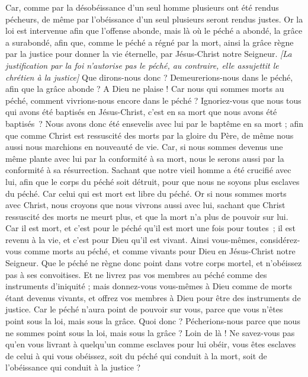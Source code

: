 \begin{multicols}{2}
Car, comme par la désobéissance d'un seul homme plusieurs ont été rendus pécheurs, de même par l'obéissance d'un seul plusieurs seront rendus justes.
Or la loi est intervenue afin que l'offense abonde, mais là où le péché a abondé, la grâce a surabondé,
afin que, comme le péché a régné par la mort, ainsi la grâce règne par la justice pour donner la vie éternelle, par Jésus-Christ notre Seigneur.
\textit{[La justification par la foi n'autorise pas le péché, au contraire, elle assujettit le chrétien à la justice]}
\VerseOne{}Que dirons-nous donc ? Demeurerions-nous dans le péché, afin que la grâce abonde ?
A Dieu ne plaise ! Car nous qui sommes morts au péché, comment vivrions-nous encore dans le péché ?
Ignoriez-vous que nous tous qui avons été baptisés en Jésus-Christ, c’est en sa mort que nous avons été baptisés ?
Nous avons donc été ensevelis avec lui par le baptême en sa mort ; afin que comme Christ est ressuscité des morts par la gloire du Père, de même nous aussi nous marchions en nouveauté de vie.
Car, si nous sommes devenus une même plante avec lui par la conformité à sa mort, nous le serons aussi par la conformité à sa résurrection.
Sachant que notre vieil homme a été crucifié avec lui, afin que le corps du péché soit détruit, pour que nous ne soyons plus esclaves du péché.
Car celui qui est mort est libre du péché.
Or si nous sommes morts avec Christ, nous croyons que nous vivrons aussi avec lui,
sachant que Christ ressuscité des morts ne meurt plus, et que la mort n'a plus de pouvoir sur lui.
Car il est mort, et c’est pour le péché qu’il est mort une fois pour toutes ; il est revenu à la vie, et c’est pour Dieu qu’il est vivant.
Ainsi vous-mêmes, considérez-vous comme morts au péché, et comme vivants pour Dieu en Jésus-Christ notre Seigneur.
Que le péché ne règne donc point dans votre corps mortel, et n’obéissez pas à ses convoitises.
Et ne livrez pas vos membres au péché comme des instruments d'iniquité ; mais donnez-vous vous-mêmes à Dieu comme de morts étant devenus vivants, et offrez vos membres à Dieu pour être des instruments de justice.
Car le péché n'aura point de pouvoir sur vous, parce que vous n'êtes point sous la loi, mais sous la grâce.
Quoi donc ? Pécherions-nous parce que nous ne sommes point sous la loi, mais sous la grâce ? Loin de là !
Ne savez-vous pas qu’en vous livrant à quelqu’un comme esclaves pour lui obéir, vous êtes esclaves de celui à qui vous obéissez, soit du péché qui conduit à la mort, soit de l'obéissance qui conduit à la justice ?

\end{multicols}

